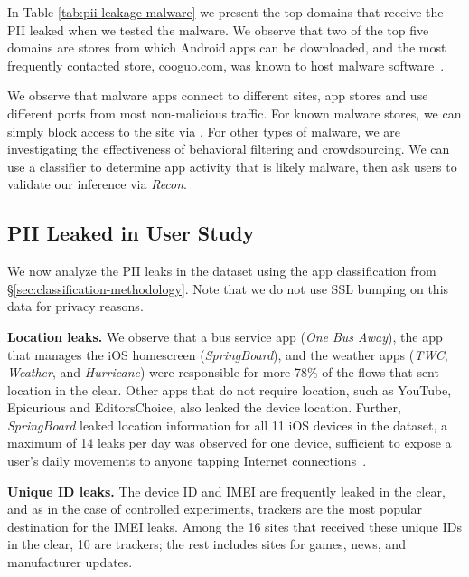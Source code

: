 In Table \ref{tab:pii-leakage-malware} we present the top domains that receive the PII leaked when we tested the malware. 
We observe that two of the top five domains are stores from which Android apps can be downloaded, and the most frequently contacted store, cooguo.com, was known to host malware software~\cite{google:browsecooguo}.

 We observe that malware apps connect to different sites, app stores and use 
different ports from most non-malicious traffic. For known malware stores, we can simply block access to 
the site via \meddle. For other types of malware, we are investigating the effectiveness of behavioral 
filtering and crowdsourcing. We can use a classifier to determine app activity that is likely malware, then 
ask users to validate our inference via \emph{Recon}.

\subsection{PII Leaked in User Study}

We now analyze the PII leaks in the \mobWild{} dataset using the app classification from \S\ref{sec:classification-methodology}. 
Note that we do not use SSL bumping on this data for privacy reasons. 

\noindent\textbf{Location leaks.}
We observe that a bus service app (\emph{One Bus Away}), the app that manages the iOS homescreen (\emph{SpringBoard}), and the weather apps (\emph{TWC}, \emph{Weather}, and \emph{Hurricane}) were responsible for more 78\% of the flows that sent location in the clear. 
Other apps that do not require location, such as YouTube, Epicurious and EditorsChoice, also leaked the device location. 
Further, \emph{SpringBoard} leaked location information for all 11 iOS devices in the \mobWild dataset, a maximum of 14 leaks per day was observed for one device, sufficient to expose a user's daily movements to anyone tapping Internet connections~\cite{nsa:globaltracking}. 

\noindent\textbf{Unique ID leaks.} 
The device ID and IMEI are frequently leaked in the clear, and as in the case of controlled experiments, trackers are the most popular destination for the IMEI leaks.  
Among the 16 sites that received these unique IDs in the clear, 10 are trackers; the rest includes sites for games, news, and manufacturer updates.

